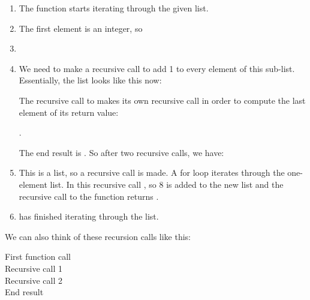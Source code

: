 \documentclass[11pt]{cselabheader}
\begin{document}
\begin{enumerate}
\item The function starts iterating through the given list.
\item {}

The first element is an integer, so


\item {}


\item {}

We need to make a recursive call to add 1 to every element of this
sub-list. Essentially, the list looks like this now:


The recursive call to  makes its own recursive call
in order to compute the last element of its return value:

\pythoninline{[4, 5, add1([5])]}.

The end result is \pythoninline{[4, 5, [6]]}.
So after two recursive calls, we have:


\item {}

This is a list, so a recursive call is made. A for loop
iterates through the one-element list. In this recursive call
, so 8 is added to the new list and
the recursive call to the function returns \pythoninline{[8]}.


\item {} has finished iterating through the list.
\end{enumerate}

We can also think of these recursion calls like this:

\begin{description}
\item[First function call] 
\item[Recursive call 1] 
\item[Recursive call 2] 
\item[End result] 
\end{description}
\end{document}
